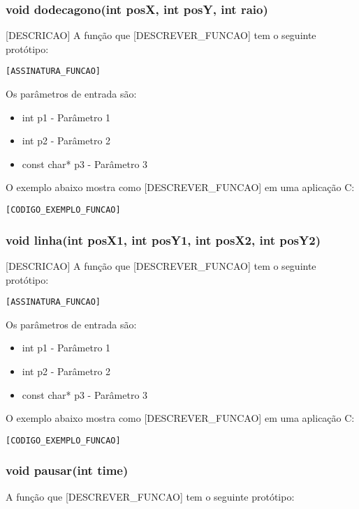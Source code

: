 \documentclass[12pt, %
openright,
oneside, %
a4paper,    %
brazil]{facom-ufu-abntex2}
\begin{document}
\subsubsection{void dodecagono(int posX, int posY, int raio)}
[DESCRICAO]
A função que [DESCREVER_FUNCAO] tem o seguinte protótipo:

\begin{lstlisting}
[ASSINATURA_FUNCAO]
\end{lstlisting}

Os parâmetros de entrada são:

\begin{itemize}
    \item int p1 - Parâmetro 1
    \item int p2 - Parâmetro 2
    \item const char* p3 - Parâmetro 3
\end{itemize}

O exemplo abaixo mostra como [DESCREVER_FUNCAO] em uma aplicação C:

\begin{lstlisting}
[CODIGO_EXEMPLO_FUNCAO]
\end{lstlisting}

\subsubsection{void linha(int posX1, int posY1, int posX2, int posY2)}
[DESCRICAO]
A função que [DESCREVER_FUNCAO] tem o seguinte protótipo:

\begin{lstlisting}
[ASSINATURA_FUNCAO]
\end{lstlisting}

Os parâmetros de entrada são:

\begin{itemize}
    \item int p1 - Parâmetro 1
    \item int p2 - Parâmetro 2
    \item const char* p3 - Parâmetro 3
\end{itemize}

O exemplo abaixo mostra como [DESCREVER_FUNCAO] em uma aplicação C:

\begin{lstlisting}
[CODIGO_EXEMPLO_FUNCAO]
\end{lstlisting}


\subsubsection{void pausar(int time)}
A função que [DESCREVER_FUNCAO] tem o seguinte protótipo:
\end{document}
